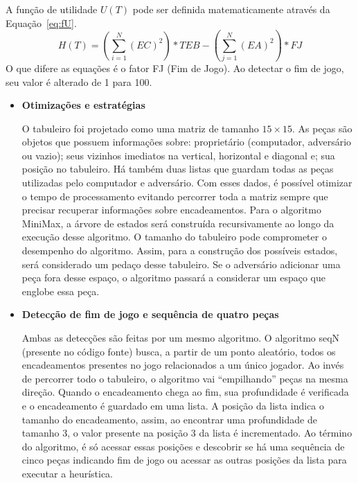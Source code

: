 \documentclass[a4paper,12pt]{article}
\begin{document}
\begin{itemize}
 A função de utilidade $U(T)$ pode ser definida matematicamente através da Equação~\ref{eq:fU}. 
  \begin{equation}\label{eq:fU}
   H(T) = \left(\sum_{i=1}^{N} (EC)^2\right)*TEB - \left(\sum_{j=1}^{N} (EA)^2\right) * FJ
 \end{equation}
 O que difere as equações é o fator FJ (Fim de Jogo). Ao detectar o fim de jogo, seu valor é alterado de 1 para 100.
\end{itemize}

\begin{itemize}
 \item \textbf{Otimizações e estratégias}
 
 O tabuleiro foi projetado como uma matriz de tamanho $15 \times 15$. As peças são objetos que possuem 
 informações sobre: proprietário (computador, adversário ou vazio); seus vizinhos imediatos na vertical, horizontal 
 e diagonal e; sua posição no tabuleiro. Há também duas listas que guardam todas as peças utilizadas pelo 
 computador e adversário. Com esses dados, é possível otimizar o tempo de processamento evitando percorrer
 toda a matriz sempre que precisar recuperar informações sobre encadeamentos. Para o algoritmo MiniMax, a 
 árvore de estados será construída recursivamente ao longo da execução desse algoritmo. O tamanho do tabuleiro
 pode comprometer o desempenho do algoritmo. Assim, para a construção dos possíveis estados, será considerado
 um pedaço desse tabuleiro. Se o adversário adicionar uma peça fora desse espaço, o algoritmo passará
 a considerar um espaço que englobe essa peça.
 
\end{itemize}

\begin{itemize}
 \item \textbf{Detecção de fim de jogo e sequência de quatro peças}
 
 Ambas as detecções são feitas por um mesmo algoritmo. O algoritmo seqN (presente no código fonte) busca,
 a partir de um ponto aleatório, todos os encadeamentos presentes no jogo relacionados a um único jogador.
 Ao invés de percorrer todo o tabuleiro, o algoritmo vai ``empilhando'' peças na mesma direção. Quando o 
 encadeamento chega ao fim, sua profundidade é verificada e o encadeamento é guardado em uma lista.
 A posição da lista indica o tamanho do encadeamento, assim, ao encontrar uma profundidade de tamanho 3, o valor
 presente na posição 3 da lista é incrementado. Ao término do algoritmo, é só acessar essas posições e descobrir
 se há uma sequência de cinco peças indicando fim de jogo ou acessar as outras posições da lista para
 executar a heurística.
 
 
\end{itemize}
\end{document}
